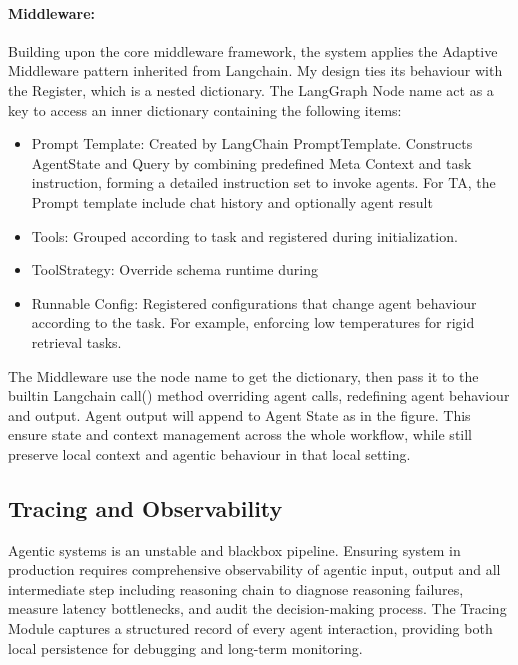 \paragraph*{Middleware:} Building upon the core middleware framework, the system applies the Adaptive Middleware pattern inherited from Langchain. My design ties its
behaviour with the Register, which is a nested dictionary. The LangGraph Node name act as a key to access an inner dictionary containing the following items:
\begin{itemize}
  \item Prompt Template: Created by LangChain PromptTemplate. Constructs AgentState and Query by combining predefined Meta Context and task instruction, 
  forming a detailed instruction set to invoke agents. For TA, the Prompt template include chat history and optionally agent result
  \item Tools: Grouped according to task and registered during initialization.
  \item ToolStrategy: Override schema runtime during
  \item Runnable Config: Registered configurations that change agent behaviour according to the task. For example, enforcing low temperatures for rigid retrieval tasks.
\end{itemize}
The Middleware use the node name to get the dictionary, then pass it to the built\-in Langchain call() method overriding agent calls, redefining agent behaviour and output.
Agent output will append to Agent State as in the figure. This ensure state and context management across the whole workflow, while still preserve local context and agentic
behaviour in that local setting.



\subsection{Tracing and Observability}\label{sub:tracing}

Agentic systems is an unstable and blackbox pipeline. Ensuring system in production requires comprehensive observability of agentic input, output and all intermediate step including reasoning chain 
to diagnose reasoning failures, measure latency bottlenecks, and audit the decision-making process. The Tracing Module captures a structured record of every agent 
interaction, providing both local persistence for debugging and long-term monitoring.

